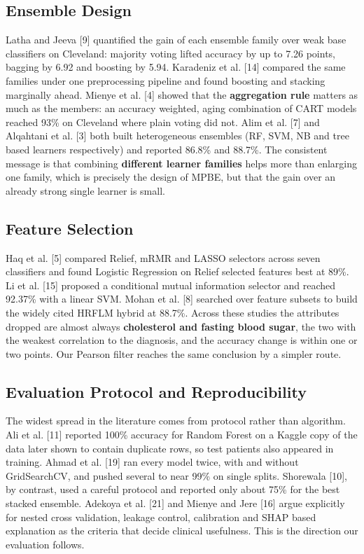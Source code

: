 \documentclass[12pt,a4paper,oneside]{report}
\begin{document}
\subsection{Ensemble Design}
Latha and Jeeva [9] quantified the gain of each ensemble family over weak base classifiers on Cleveland: majority voting lifted accuracy by up to 7.26 points, bagging by 6.92 and boosting by 5.94. Karadeniz et al. [14] compared the same families under one preprocessing pipeline and found boosting and stacking marginally ahead. Mienye et al. [4] showed that the \textbf{aggregation rule} matters as much as the members: an accuracy weighted, aging combination of CART models reached 93\% on Cleveland where plain voting did not. Alim et al. [7] and Alqahtani et al. [3] both built heterogeneous ensembles (RF, SVM, NB and tree based learners respectively) and reported 86.8\% and 88.7\%. The consistent message is that combining \textbf{different learner families} helps more than enlarging one family, which is precisely the design of MPBE, but that the gain over an already strong single learner is small.

\subsection{Feature Selection}
Haq et al. [5] compared Relief, mRMR and LASSO selectors across seven classifiers and found Logistic Regression on Relief selected features best at 89\%. Li et al. [15] proposed a conditional mutual information selector and reached 92.37\% with a linear SVM. Mohan et al. [8] searched over feature subsets to build the widely cited HRFLM hybrid at 88.7\%. Across these studies the attributes dropped are almost always \textbf{cholesterol and fasting blood sugar}, the two with the weakest correlation to the diagnosis, and the accuracy change is within one or two points. Our Pearson filter reaches the same conclusion by a simpler route.

\subsection{Evaluation Protocol and Reproducibility}
The widest spread in the literature comes from protocol rather than algorithm. Ali et al. [11] reported 100\% accuracy for Random Forest on a Kaggle copy of the data later shown to contain duplicate rows, so test patients also appeared in training. Ahmad et al. [19] ran every model twice, with and without GridSearchCV, and pushed several to near 99\% on single splits. Shorewala [10], by contrast, used a careful protocol and reported only about 75\% for the best stacked ensemble. Adekoya et al. [21] and Mienye and Jere [16] argue explicitly for nested cross validation, leakage control, calibration and SHAP based explanation as the criteria that decide clinical usefulness. This is the direction our evaluation follows.
\end{document}
